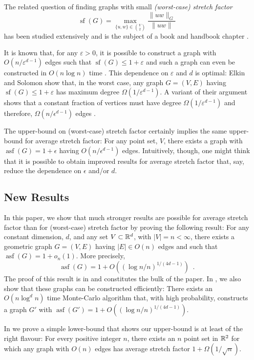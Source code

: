 \documentclass{patmorin}
\DeclareMathOperator{\asf}{asf}
\DeclareMathOperator{\strf}{sf}
\newcommand{\eps}{\varepsilon}
\begin{document}
The related question of finding graphs with small \emph{(worst-case)
stretch factor}
\[
    \strf(G) = \max_{\{u,w\}\in\binom{V}{2}}\frac{\|uw\|_G}{\|uw\|} 
\]
has been studied extensively and is the subject of a book
\cite{narasimhan.smid:geometric} and handbook chapter
\cite{eppstein:spanning}.

It is known that, for any $\eps >0$, it is possible to construct a
graph with $O(n/\eps^{d-1})$ edges such that $\strf(G)\le 1+\eps$
\cite{ruppert.seidel:approximating} and such a graph can even
be constructed in $O(n\log n)$ time \cite{carmi.smid:optimal}.
This dependence on $\eps$ and $d$ is optimal: Elkin and Solomon
\cite{elkin.solomon:steiner} show that, in the worst case, any
graph $G=(V,E)$ having $\strf(G)\le 1+\eps$ has maximum degree
$\Omega(1/\eps^{d-1})$.  A variant of their argument shows that a
constant fraction of vertices must have degree $\Omega(1/\eps^{d-1})$
and therefore, $\Omega(n/\epsilon^{d-1})$ edges \cite{solomon}.


The upper-bound on (worst-case) stretch factor certainly implies the same
upper-bound for average stretch factor: For any point set, $V$, there
exists a graph with $\asf(G)=1+\epsilon$ having $O(n/\epsilon^{d-1})$
edges.  Intuitively, though, one might think that it is possible to
obtain improved results for average stretch factor that, say, reduce
the dependence on $\epsilon$ and/or $d$.

\subsection{New Results}

In this paper, we show that much stronger results are possible for
average stretch factor than for (worst-case) stretch factor by proving
the following result: For any constant dimension, $d$, and any set
$V\subset \mathbb{R}^d$, with $|V|=n<\infty$, there exists a geometric graph
$G=(V,E)$ having $|E|\in O(n)$ edges and such that $\asf(G)=1+o_n(1)$.
More precisely,
\[
   \asf(G)=1+O((\log n/n)^{1/(4d-1)}) \enspace .
\]
The proof of this result is in  and constitutes the
bulk of the paper.  In , we also show that these graphs
can be constructed efficiently:  There exists an $O(n\log^d n)$ time
Monte-Carlo algorithm that, with high probability, constructs a graph $G'$
with $\asf(G')=1+O((\log n/n)^{1/(4d-1)})$.


In  we prove a simple lower-bound that shows our
upper-bound is at least of the right flavour:  For every positive integer
$n$, there exists an $n$ point set in $\mathbb{R}^2$ for which any graph with
$O(n)$ edges has average stretch factor $1+\Omega(1/\sqrt{n})$.
\end{document}
